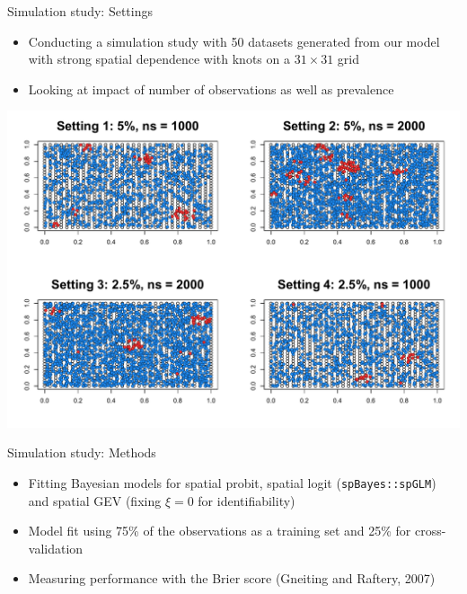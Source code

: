 \documentclass{beamer}
\begin{document}
\begin{frame}{Simulation study: Settings}
  \begin{itemize} \setlength{\itemsep}{0.5em}
    \item Conducting a simulation study with 50 datasets generated from our model with strong spatial dependence with knots on a $31 \times 31$ grid
    \item Looking at impact of number of observations as well as prevalence
  \end{itemize}
  \centering
  \includegraphics[width=0.7\linewidth]{./plots/simulated_data.pdf}
\end{frame}

\begin{frame}{Simulation study: Methods}
  \begin{itemize} \setlength{\itemsep}{1em}
    \item Fitting Bayesian models for spatial probit, spatial logit ({\tt spBayes::spGLM}) and spatial GEV (fixing $\xi = 0$ for identifiability)
    \item Model fit using 75\% of the observations as a training set and 25\% for cross-validation
    \item Measuring performance with the Brier score (Gneiting and Raftery, 2007)
  \end{itemize}
\end{frame}
\end{document}
